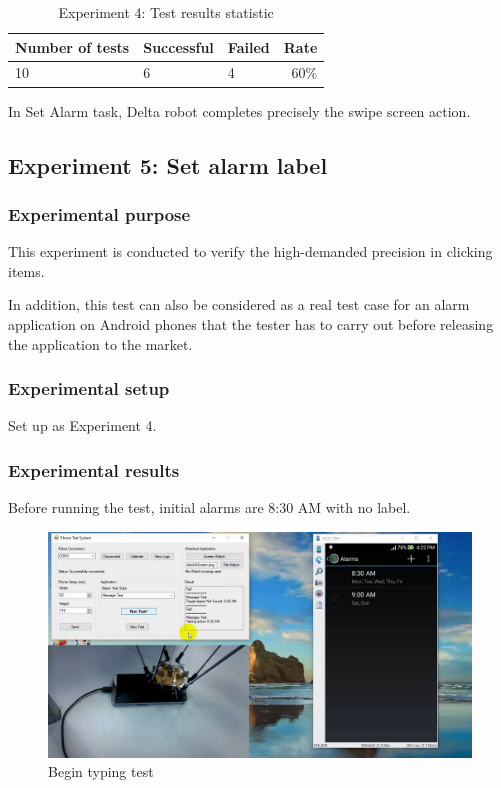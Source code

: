 \begin{table}[H]
	\centering
	\caption{Experiment 4: Test results statistic}	
	\label{tab:exp4_result_stat}
	\begin{tabular}{|lll|r|}
		\hline
		\textbf{Number of tests} & \textbf{Successful} & \textbf{Failed} & \textbf{Rate} \\
		\hline
		10 & 6 & 4 & 60$\%$\\
		\hline
	\end{tabular}
\end{table}

In Set Alarm task, Delta robot completes precisely the swipe screen action.

\subsection{Experiment 5: Set alarm label}
\subsubsection{Experimental purpose}
This experiment is conducted to verify the high-demanded precision in clicking items.

In addition, this test can also be considered as a real test case for an alarm application on Android phones that the tester has to carry out before releasing the application to the market.

\subsubsection{Experimental setup}
Set up as Experiment 4.

\subsubsection{Experimental results}
Before running the test, initial alarms are 8:30 AM with no label.

	\begin{figure}[H]
		\centering
		\includegraphics[scale=0.5]{Chapters/Fig/label_first.png}
		\caption{Begin typing test}
		\label{fig:label_first}
	\end{figure}

